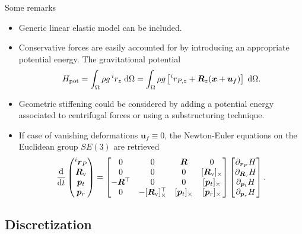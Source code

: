 \documentclass[aspectratio=169]{ISAE-Beamer}
\newcommand{\crmat}[1]{\ensuremath{[#1]_{\times}}}
\begin{document}
\begin{frame}{Some remarks}

\begin{itemize}
	\item Generic linear elastic model can be included.
	\item Conservative forces are easily accounted for by introducing an appropriate potential energy. The gravitational potential
	\begin{equation*}
	H_{\text{pot}} = \int_{\Omega} \rho g \, ^i r_z \d{\Omega} = \int_{\Omega} \rho g \left[ ^i r_{P, z} +\bm{R}_z (\bm{x} + \bm{u}_f) \right] \d{\Omega}.
	\end{equation*}
	\item Geometric stiffening could be considered by adding a potential energy associated to centrifugal forces or using a substructuring technique.
	\item If case of vanishing deformations $\bm{u}_f \equiv 0$, the Newton-Euler equations on the Euclidean group $SE(3)$ are retrieved
	\begin{equation*}
	\diff{}{t}
	\begin{pmatrix}
	^i{\bm{r}}_P \\
	\bm{R}_{\mathrm{v}} \\
	{\bm{p}}_t \\ 
	{\bm{p}}_r \\
	\end{pmatrix} = 
	\begin{bmatrix}
	0 & 0 & \bm{R} & 0 \\
	0 & 0 & 0 & \crmat{\bm{R}_{\text{v}}} \\
	- \bm{R}^\top & 0 & 0 & \crmat{\bm{p}_t}\\
	0 & -\crmat{\bm{R}_{\text{v}}}^\top & \crmat{\bm{p}_t} & \crmat{\bm{p}_r} \\
	\end{bmatrix}
	\begin{bmatrix}
	\partial_{\bm{r}_P} H \\ 
	\partial_{\bm{R}_{\text{v}}} H \\ 
	\partial_{\bm{p}_t} H \\ 
	\partial_{\bm{p}_r} H \\ 
	\end{bmatrix}.
	\end{equation*}
\end{itemize}
\end{frame}

\subsection{Discretization}
\end{document}
